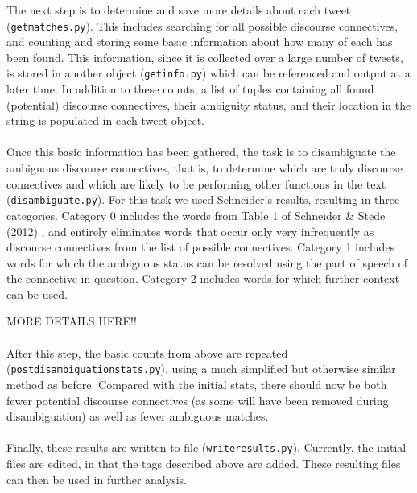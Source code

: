\documentclass[11pt]{article}
\def\mono#1{\texttt{#1}}  %
\begin{document}
The next step is to determine and save more details about each tweet (\mono{get\textunderscore matches.py}).  This includes searching for all possible discourse connectives, and counting and storing some basic information about how many of each has been found.  This information, since it is collected over a large number of tweets, is stored in another object (\mono{get\textunderscore info.py}) which can be referenced and output at a later time.  In addition to these counts, a list of tuples containing all found (potential) discourse connectives, their ambiguity status, and their location in the string is populated in each tweet object.\\
\\
Once this basic information has been gathered, the task is to disambiguate the ambiguous discourse connectives, that is, to determine which are truly discourse connectives and which are likely to be performing other functions in the text (\mono{disambiguate.py}).  For this task we used Schneider's results, resulting in three categories.  Category 0 includes the words from Table 1 of Schneider \& Stede (2012) \cite{schneider2}, and entirely eliminates words that occur only very infrequently as discourse connectives from the list of possible connectives.  Category 1 includes words for which the ambiguous status can be resolved using the part of speech of the connective in question.  Category 2 includes words for which further context can be used.

MORE DETAILS HERE!!\\
\\
After this step, the basic counts from above are repeated (\mono{post\textunderscore disambiguation\textunderscore stats.py}), using a much simplified but otherwise similar method as before.  Compared with the initial stats, there should now be both fewer potential discourse connectives (as some will have been removed during disambiguation) as well as fewer ambiguous matches.\\
\\
Finally, these results are written to file (\mono{write\textunderscore results.py}).  Currently, the initial files are edited, in that the tags described above are added.  These resulting files can then be used in further analysis.
\end{document}
